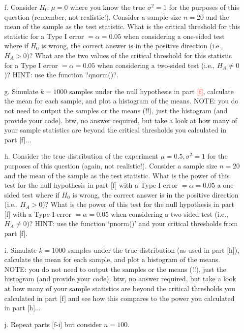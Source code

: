 \documentclass[letterpaper, 11pt]{article}
\begin{document}
\begin{itemize}
\item[f.] Consider $H_0: \mu = 0$ where you know the true $\sigma^2=1$ for the purposes of this question (remember, not realistic!).  Consider a sample size $n=20$ and the mean of the sample as the test statistic.  What is the critical threshold for this statistic for a Type I error $= \alpha = 0.05$ when considering a one-sided test where if $H_0$ is wrong, the correct answer is in the positive direction (i.e., $H_A > 0$)?  What are the two values of the critical threshold for this statistic for a Type I error $= \alpha = 0.05$ when considering a two-sided test (i.e., $H_A \neq 0$)?  HINT: use the function ?qnorm()?.

\item[g.] Simulate $k=1000$ samples under the null hypothesis in part \textcolor{red}{[f]}, calculate the mean for each sample, and plot a histogram of the means.  NOTE: you do not need to output the samples or the means (!!), just the histogram (and provide your code).  btw, no answer required, but take a look at how many of your sample statistics are beyond the critical thresholds you calculated in part [f]...

\item[h.] Consider the true distribution of the experiment $\mu = 0.5, \sigma^2=1$ for the purposes of this question (again, not realistic!).  Consider a sample size $n=20$ and the mean of the sample as the test statistic.  What is the power of this test for the null hypothesis in part [f] with a Type I error $= \alpha = 0.05$ a one-sided test where if $H_0$ is wrong, the correct answer is in the positive direction (i.e., $H_A > 0$)?  What is the power of this test for the null hypothesis in part [f] with a Type I error $= \alpha = 0.05$ when considering a two-sided test (i.e., $H_A \neq 0$)?  HINT: use the function `pnorm()' and your critical thresholds from part [f].

\item[i.] Simulate $k=1000$ samples under the true distribution (as used in part [h]), calculate the mean for each sample, and plot a histogram of the means.  NOTE: you do not need to output the samples or the means (!!), just the histogram (and provide your code).  btw, no answer required, but take a look at how many of your sample statistics are beyond the critical thresholds you calculated in part [f] and see how this compares to the power you calculated in part [h]...

\item[j.] Repeat parts [f-i] but consider $n=100$.

\end{itemize}
\end{document}
